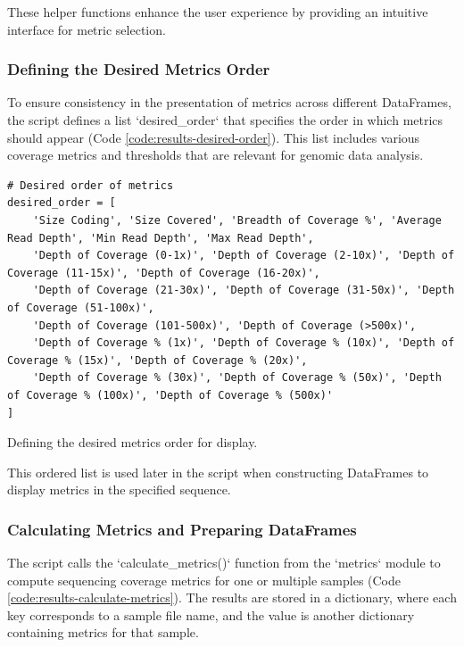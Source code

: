 These helper functions enhance the user experience by providing an intuitive interface for metric selection.

\subsubsection{\textbf{Defining the Desired Metrics Order}}

To ensure consistency in the presentation of metrics across different DataFrames, the script defines a list `desired\_order` that specifies the order in which metrics should appear (Code \ref{code:results-desired-order}). This list includes various coverage metrics and thresholds that are relevant for genomic data analysis.

\begin{longlisting}
\begin{verbatim}
# Desired order of metrics
desired_order = [
    'Size Coding', 'Size Covered', 'Breadth of Coverage %', 'Average Read Depth', 'Min Read Depth', 'Max Read Depth',
    'Depth of Coverage (0-1x)', 'Depth of Coverage (2-10x)', 'Depth of Coverage (11-15x)', 'Depth of Coverage (16-20x)',
    'Depth of Coverage (21-30x)', 'Depth of Coverage (31-50x)', 'Depth of Coverage (51-100x)',
    'Depth of Coverage (101-500x)', 'Depth of Coverage (>500x)',
    'Depth of Coverage % (1x)', 'Depth of Coverage % (10x)', 'Depth of Coverage % (15x)', 'Depth of Coverage % (20x)',
    'Depth of Coverage % (30x)', 'Depth of Coverage % (50x)', 'Depth of Coverage % (100x)', 'Depth of Coverage % (500x)'
]
\end{verbatim}
\caption{Defining the desired metrics order for display.}
\label{code:results-desired-order}
\end{longlisting}

This ordered list is used later in the script when constructing DataFrames to display metrics in the specified sequence.

\subsubsection{\textbf{Calculating Metrics and Preparing DataFrames}}

The script calls the `calculate\_metrics()` function from the `metrics` module to compute sequencing coverage metrics for one or multiple samples (Code \ref{code:results-calculate-metrics}). The results are stored in a dictionary, where each key corresponds to a sample file name, and the value is another dictionary containing metrics for that sample.

